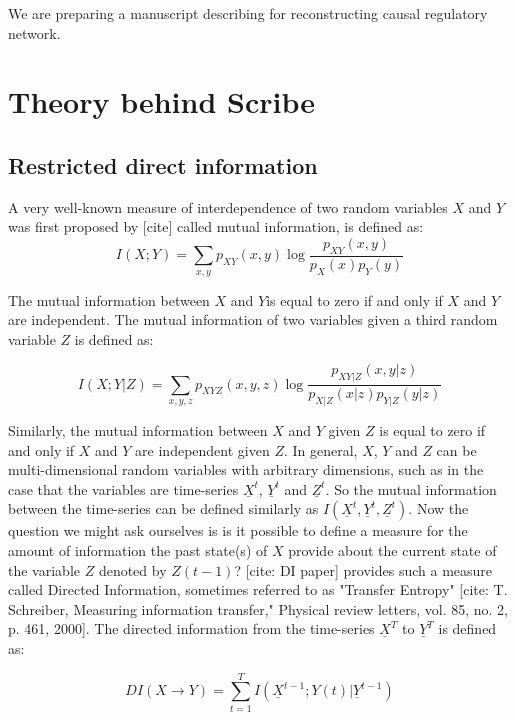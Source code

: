 \documentclass[10pt,oneside]{article}\usepackage[]{graphicx}\usepackage[]{color}
\begin{document}
We are preparing a manuscript describing  for reconstructing causal regulatory network.

\section{Theory behind Scribe}\label{theory}

\subsection{Restricted direct information}\label{RDI}
A very well-known measure of interdependence of two random variables $X$ and $Y$ was first proposed by [cite] called mutual information, is defined as:
\begin{equation}
I(X;Y)=\sum_{x,y} p_{XY}(x,y) \log\frac{p_{XY}(x,y)}{p_X(x)p_Y(y)}
\end{equation}

The mutual information between $X$ and $Y$is equal to zero if and only if $X$ and $Y$ are independent. The mutual information of two variables given a third random variable $Z$ is defined as:

\begin{equation}
I(X;Y|Z)=\sum_{x,y,z} p_{XYZ}(x,y,z) \log\frac{p_{XY|Z}(x,y|z)}{p_{X|Z}(x|z)p_{Y|Z}(y|z)}
\end{equation}

Similarly, the mutual information between $X$ and $Y$ given $Z$ is equal to zero if and only if $X$ and $Y$ are independent given $Z$.
In general, $X$, $Y$ and $Z$ can be multi-dimensional random variables with arbitrary dimensions, such as in the case that the variables are time-series $\underline{X}^t$, $\underline{Y}^t$ and $\underline{Z}^t$. So the mutual information between the time-series can be defined similarly as $ I(\underline{X}^t,\underline{Y}^t,\underline{Z}^t) $.
Now the question we might ask ourselves is is it possible to define a measure for the amount of information the past state(s) of $X$ provide about the current state of the variable $Z$ denoted by $Z(t-1)$? [cite: DI paper] provides such a measure called Directed Information, sometimes referred to as "Transfer Entropy" [cite: T. Schreiber, Measuring information transfer," Physical review letters, vol. 85, no. 2, p. 461, 2000]. The directed information from the time-series $\underline{X}^T$ to $\underline{Y}^T$ is defined as:

\begin{equation}
DI(X\rightarrow Y)=\sum_{t=1}^T I(\underline{X}^{t-1}; Y(t)|\underline{Y}^{t-1})
\end{equation}
\end{document}
